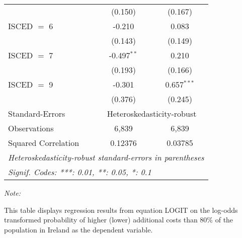 \begin{table}[htbp!]
\begin{adjustbox}{width = 1\textwidth, max height = 0.95\textheight, center}
\begin{threeparttable}[b]
\begin{tabular}{lcc}
                                 & (0.150)        & (0.167)\\   
            ISCED $=$ 6          & -0.210         & 0.083\\   
                                 & (0.143)        & (0.149)\\   
            ISCED $=$ 7          & -0.497$^{**}$  & 0.210\\   
                                 & (0.193)        & (0.166)\\   
            ISCED $=$ 9          & -0.301         & 0.657$^{***}$\\   
                                 & (0.376)        & (0.245)\\   
            \midrule 
            Standard-Errors & \multicolumn{2}{c}{Heteroskedasticity-robust} \\ 
            Observations         & 6,839          & 6,839\\  
            Squared Correlation  & 0.12376        & 0.03785\\  
            \midrule \midrule
            \multicolumn{3}{l}{\emph{Heteroskedasticity-robust standard-errors in parentheses}}\\
            \multicolumn{3}{l}{\emph{Signif. Codes: ***: 0.01, **: 0.05, *: 0.1}}\\
         \end{tabular}
         
         \begin{tablenotes}\item \medskip \textit{Note:}
            \item This table displays regression results from equation LOGIT on the log-odds transformed probability of higher (lower) additional costs than 80\% of the population in Ireland as the dependent variable. 
         \end{tablenotes}
      \end{threeparttable}
   \end{adjustbox}
\end{table}


